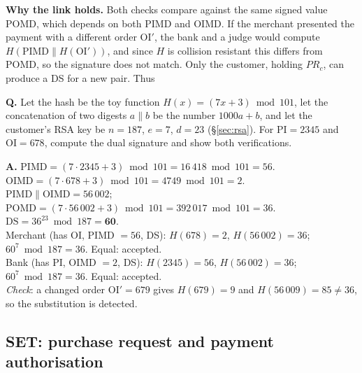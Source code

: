 \textbf{Why the link holds.} Both checks compare against the same signed value POMD, which depends on both PIMD and OIMD. If the merchant presented the payment with a different order OI$'$, the bank and a judge would compute $H(\mathrm{PIMD} \| H(\mathrm{OI}'))$, and since $H$ is collision resistant this differs from POMD, so the signature does not match. Only the customer, holding $PR_c$, can produce a DS for a new pair. Thus 

\begin{worked}
\textbf{Q.} Let the hash be the toy function $H(x) = (7x + 3) \bmod 101$, let the concatenation of two digests $a \| b$ be the number $1000a + b$, and let the customer's RSA key be $n = 187$, $e = 7$, $d = 23$ (\S\ref{sec:rsa}). For $\mathrm{PI} = 2345$ and $\mathrm{OI} = 678$, compute the dual signature and show both verifications.

\textbf{A.} $\mathrm{PIMD} = (7 \cdot 2345 + 3) \bmod 101 = 16\,418 \bmod 101 = 56$. $\mathrm{OIMD} = (7 \cdot 678 + 3) \bmod 101 = 4749 \bmod 101 = 2$.\\
$\mathrm{PIMD} \| \mathrm{OIMD} = 56\,002$; $\mathrm{POMD} = (7 \cdot 56\,002 + 3) \bmod 101 = 392\,017 \bmod 101 = 36$.\\
$\mathrm{DS} = 36^{23} \bmod 187 = \mathbf{60}$.\\
Merchant (has OI, PIMD $= 56$, DS): $H(678) = 2$, $H(56\,002) = 36$; $60^{7} \bmod 187 = 36$. Equal: accepted.\\
Bank (has PI, OIMD $= 2$, DS): $H(2345) = 56$, $H(56\,002) = 36$; $60^7 \bmod 187 = 36$. Equal: accepted.\\
\emph{Check}: a changed order $\mathrm{OI}' = 679$ gives $H(679) = 9$ and $H(56\,009) = 85 \ne 36$, so the substitution is detected.
\end{worked}

\subsection{SET: purchase request and payment authorisation \new}

\begin{center}
\end{center}

